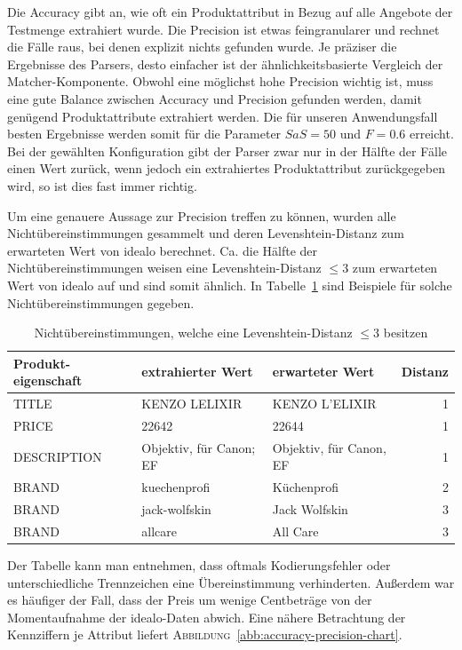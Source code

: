 Die Accuracy gibt an, wie oft ein Produktattribut in Bezug auf alle Angebote der Testmenge extrahiert wurde.
Die Precision ist etwas feingranularer und rechnet die Fälle raus, bei denen explizit nichts gefunden wurde.
Je präziser die Ergebnisse des Parsers, desto einfacher ist der ähnlichkeitsbasierte Vergleich der Matcher-Komponente.
Obwohl eine möglichst hohe Precision wichtig ist, muss eine gute Balance zwischen Accuracy und Precision gefunden
werden, damit genügend Produktattribute extrahiert werden.
Die für unseren Anwendungsfall besten Ergebnisse werden somit für die Parameter $SaS = 50$ und $F= 0.6$ erreicht.
Bei der gewählten Konfiguration gibt der Parser zwar nur in der Hälfte der Fälle einen Wert zurück, wenn jedoch ein
extrahiertes Produktattribut zurückgegeben wird, so ist dies fast immer richtig.

Um eine genauere Aussage zur Precision treffen zu können, wurden alle Nichtübereinstimmungen gesammelt und deren
Levenshtein-Distanz zum erwarteten Wert von idealo berechnet.
Ca. die Hälfte der Nichtübereinstimmungen weisen eine Levenshtein-Distanz $\leq 3$ zum erwarteten Wert von idealo
auf und sind somit ähnlich.
In Tabelle~\ref{tab:levenshtein-examples} sind Beispiele für solche Nichtübereinstimmungen gegeben.

\begin{table}[h]
    \centering
    \begin{tabular}{ p{2.75cm} | p{4.5cm} | p{4.5cm} | r}
        \textbf{Produkt-eigenschaft} & \textbf{extrahierter Wert} & \textbf{erwarteter Wert} &
        \textbf{Distanz} \\
        \hline
        TITLE & KENZO LELIXIR & KENZO L'ELIXIR & 1\\
        PRICE & 22642 & 22644 & 1\\
        DESCRIPTION & Objektiv, für Canon; EF	& Objektiv, für Canon, EF & 1\\
        BRAND &	kuechenprofi & Küchenprofi & 2\\
        BRAND & jack-wolfskin & Jack Wolfskin & 3\\
        BRAND & allcare & All Care & 3
    \end{tabular}
    \caption{Nichtübereinstimmungen, welche eine Levenshtein-Distanz $\leq 3$ besitzen}
    \label{tab:levenshtein-examples}
    \vspace{-0.25cm}
\end{table}

Der Tabelle kann man entnehmen, dass oftmals Kodierungsfehler oder unterschiedliche Trennzeichen eine
Übereinstimmung verhinderten.
Außerdem war es häufiger der Fall, dass der Preis um wenige Centbeträge von der Momentaufnahme der idealo-Daten
abwich.
\newpage
Eine nähere Betrachtung der Kennziffern je Attribut liefert \textsc{Abbildung}~\ref{abb:accuracy-precision-chart}.

